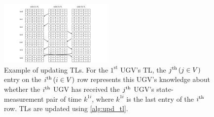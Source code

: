 	\begin{figure}%
		\centering
		\includegraphics[width=0.50\textwidth]{figures/track_list}
		\caption{Example of updating TLs. For the $1^\text{st}$ UGV's TL, the $j^\text{th}\,(j\in V)$ entry on the $i^\text{th}\,(i\in V)$ row represents this UGV's knowledge about whether the $i^\text{th}$ UGV has received the $j^\text{th}$ UGV's state-measurement pair of time $k^{1i}$, where $k^{1i}$ is the last entry of the $i^\text{th}$ row. TLs are updated using \cref{alg:upd_tl}.}
		\label{fig:upd_tl}
	\end{figure}
	
